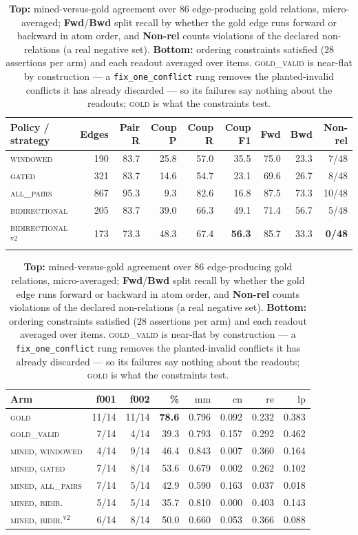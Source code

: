 \documentclass{article} %
\newcommand{\readout}[1]{\ensuremath{\mathrm{#1}}}
\newcommand{\mm}{\readout{mm}}
\newcommand{\cons}{\readout{cn}}
\newcommand{\rei}{\readout{re}}
\newcommand{\lp}{\readout{lp}}
\begin{document}
\begin{table}[t]
\centering\footnotesize
\caption{\textbf{Top:} mined-versus-gold agreement over $86$ edge-producing gold relations,
  micro-averaged; \textbf{Fwd}/\textbf{Bwd} split recall by whether the gold edge runs forward or
  backward in atom order, and \textbf{Non-rel} counts violations of the declared non-relations (a
  real negative set). \textbf{Bottom:} ordering constraints satisfied ($28$ assertions per arm) and
  each readout averaged over items. \textsc{gold\_valid} is near-flat by construction --- a
  \texttt{fix\_one\_conflict} rung removes the planted-invalid conflicts it has already discarded
  --- so its failures say nothing about the readouts; \textsc{gold} is what the constraints test.}
\label{tab:mining}
\begin{tabular}{@{}lrrrrrrrr@{}}
\toprule
Policy / strategy & Edges & Pair R & Coup P & Coup R & Coup F1 & Fwd & Bwd & Non-rel \\
\midrule
\textsc{windowed}        & 190 & 83.7 & 25.8 & 57.0 & 35.5 & 75.0 & 23.3 & 7/48 \\
\textsc{gated}           & 321 & 83.7 & 14.6 & 54.7 & 23.1 & 69.6 & 26.7 & 8/48 \\
\textsc{all\_pairs}      & 867 & 95.3 &  9.3 & 82.6 & 16.8 & 87.5 & 73.3 & 10/48 \\
\textsc{bidirectional}   & 205 & 83.7 & 39.0 & 66.3 & 49.1 & 71.4 & 56.7 & 5/48 \\
\textsc{bidirectional}$^{\text{v2}}$ & 173 & 73.3 & 48.3 & 67.4 & \textbf{56.3} & 85.7 & 33.3 & \textbf{0/48} \\
\bottomrule
\end{tabular}

\vspace{4pt}
\begin{tabular}{@{}lrrrrrrr@{}}
\toprule
Arm & f001 & f002 & \% & $\mm$ & $\cons$ & $\rei$ & $\lp$ \\
\midrule
\textsc{gold}                       & 11/14 & 11/14 & \textbf{78.6} & 0.796 & 0.092 & 0.232 & 0.383 \\
\textsc{gold\_valid}                &  7/14 &  4/14 & 39.3 & 0.793 & 0.157 & 0.292 & 0.462 \\
\textsc{mined}, \textsc{windowed}   &  4/14 &  9/14 & 46.4 & 0.843 & 0.007 & 0.360 & 0.164 \\
\textsc{mined}, \textsc{gated}      &  7/14 &  8/14 & 53.6 & 0.679 & 0.002 & 0.262 & 0.102 \\
\textsc{mined}, \textsc{all\_pairs} &  7/14 &  5/14 & 42.9 & 0.590 & 0.163 & 0.037 & 0.018 \\
\textsc{mined}, \textsc{bidir.}     &  5/14 &  5/14 & 35.7 & 0.810 & 0.000 & 0.403 & 0.143 \\
\textsc{mined}, \textsc{bidir.}$^{\text{v2}}$ &  6/14 &  8/14 & 50.0 & 0.660 & 0.053 & 0.366 & 0.088 \\
\bottomrule
\end{tabular}
\end{table}
\end{document}
